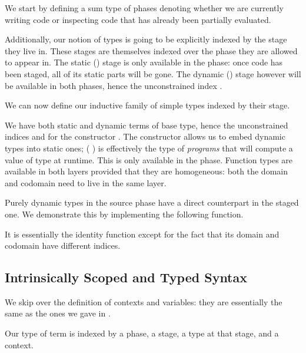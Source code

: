 We start by defining a sum type of phases denoting whether
we are currently writing  code or inspecting
 code that has already been partially evaluated.


Additionally, our notion of types is going to be explicitly
indexed by the stage they live in. These stages are themselves
indexed over the phase they are allowed to appear in.
%
The static () stage is only available in the 
phase: once code has been staged, all of its static parts will
be gone.
%
The dynamic () stage however will be available in both
phases, hence the unconstrained index .


We can now define our inductive family of simple types indexed
by their stage.


We have both static and dynamic terms of base type,
hence the unconstrained indices  and 
for the constructor .
%
The constructor  allows us to embed dynamic
types into static ones; ( ) is effectively
the type of \emph{programs} that will compute a value of
type  at runtime. This is only available in the
 phase.
%
Function types are available in both layers provided that
they are homogeneous: both the domain and codomain need
to live in the same layer.

Purely dynamic types in the source phase have a direct
counterpart in the staged one. We demonstrate this by
implementing the following  function.


It is essentially the identity function except for the
fact that its domain and codomain have different indices.

\subsection{Intrinsically Scoped and Typed Syntax}

We skip over the definition of contexts and variables: they
are essentially the same as the ones we gave in .

Our type of term is indexed by a phase, a stage, a type
at that stage, and a context.


